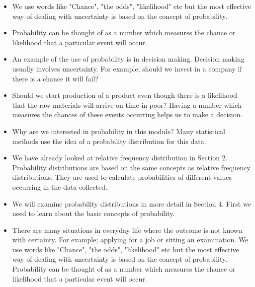 \documentclass[]{report}
\begin{document}
{{{{{{{\begin{itemize}
\item We use words like "Chance", "the odds", "likelihood" etc but the most effective way of dealing with uncertainty is based on the concept of probability.

\item Probability can be thought of as a number which measures the chance or likelihood that a particular event will occur.

\end{itemize}
\begin{itemize}
\item An example of the use of probability is in decision making. Decision making usually involves uncertainty. For example, should we invest in a company if there is a chance it will fail? 

\item Should we start production of a product even though there is a likelihood that the raw materials will arrive on time in poor? Having a number which measures the chances of these events occurring helps us to make a decision.

\item Why are we interested in probability in this module? Many statistical methods use the idea of a probability distribution for this data.
\end{itemize}

\begin{itemize}
\item We have already looked at relative frequency distribution in Section 2. Probability distributions are based on the same concepts as relative frequency distributions. They are used to calculate probabilities of different values occurring in the data collected.

\item We will examine probability distributions in more detail in Section 4. First we need to learn about the basic concepts of probability.
\end{itemize}

}

\begin{itemize}
\item There are many situations in everyday life where the outcome is not known with certainty. For example; applying for a job or sitting an examination. We use words like "Chance", "the odds", "likelihood" etc but the most effective way of dealing with uncertainty is based on the concept of probability. Probability can be thought of as a number which measures the chance or likelihood that a particular event will occur.





\end{itemize}}}}}}}
\end{document}
